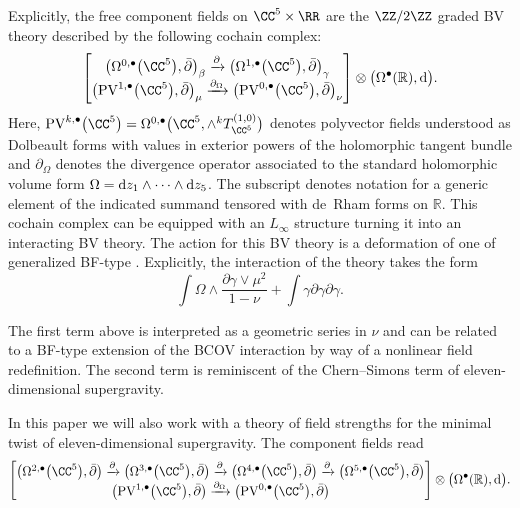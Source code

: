 \documentclass[10pt,a4paper]{amsart}
\numberwithin{equation}{section}
\theoremstyle{definition}
\def\R{\mathbb{R}}
\def\d{{\rm d}}
\def\bu{\bullet}
\begin{document}
Explicitly, the free component fields on $\CC^5 \times \RR$ are the $\ZZ/2\ZZ$ graded BV theory described by the following cochain complex:
\begin{equation} \label{eq: comp-min-tw}
\begin{bmatrix}
\big(\Omega^{0,\bu}\big(\CC^5\big) ,\bar{\partial}\big)_\beta \xrightarrow{\partial} \big(\Omega^{1,\bu}\big(\CC^5\big) , \bar{\partial}\big)_\gamma \\
\big(\mathrm{PV}^{1,\bu}\big(\CC^5\big) , \bar{\partial}\big)_\mu \xrightarrow{\partial_{\Omega}} \big(\mathrm{PV}^{0,\bu}\big(\CC^5\big),\bar{\partial}\big)_\nu \\
\end{bmatrix} \otimes \big(\Omega^\bu(\R) ,\d\big).
\end{equation}
Here, $\mathrm{PV}^{k,\bu}\big(\CC^5\big) = \Omega^{0,\bu}\big(\CC^5 , \wedge^k T_{\CC^5}^{(1,0)}\big)$ denotes polyvector fields understood as Dolbeault forms with values in exterior powers of the holomorphic tangent bundle and $\partial_\Omega$ denotes the divergence operator associated to the standard holomorphic volume form $\Omega = \d z_1 \wedge \dots \wedge \d z_5$. The subscript denotes notation for a generic element of the indicated summand tensored with de~Rham forms on $\R$. This cochain complex can be equipped with an $L_\infty$ structure turning it into an interacting BV theory. The action for this BV theory is a deformation of one of generalized BF-type \cite{RSW}. Explicitly, the interaction of the theory takes the form
\[
\int \Omega \wedge \frac{\partial\gamma \vee \mu^2}{1-\nu} + \int \gamma\partial\gamma\partial\gamma.
\]

The first term above is interpreted as a geometric series in $\nu$ and can be related to a BF-type extension of the BCOV interaction by way of a nonlinear field redefinition. The second term is reminiscent of the Chern--Simons term of eleven-dimensional supergravity.

In this paper we will also work with a theory of field strengths for the minimal twist of eleven-dimensional supergravity. The component fields read
\begin{equation} \label{eq: comp-min-tw-str}
\begin{bmatrix}
\big(\Omega^{2,\bu}\big(\CC^5\big) , \bar{\partial}\big) \xrightarrow{\partial} \big(\Omega^{3,\bu}\big(\CC^5\big) , \bar{\partial}\big) \xrightarrow{\partial} \big(\Omega^{4,\bu}\big(\CC^5\big) , \bar{\partial}\big) \xrightarrow{\partial} \big(\Omega^{5,\bu}\big(\CC^5\big) , \bar{\partial}\big) \\
\big(\mathrm{PV}^{1,\bu}\big(\CC^5\big) , \bar{\partial}\big) \xrightarrow{\partial_{\Omega}}\big(\mathrm{PV}^{0,\bu}\big(\CC^5\big),\bar{\partial}\big)
\end{bmatrix} \otimes \big(\Omega^\bu(\R) ,\d\big).
\end{equation}
\end{document}
